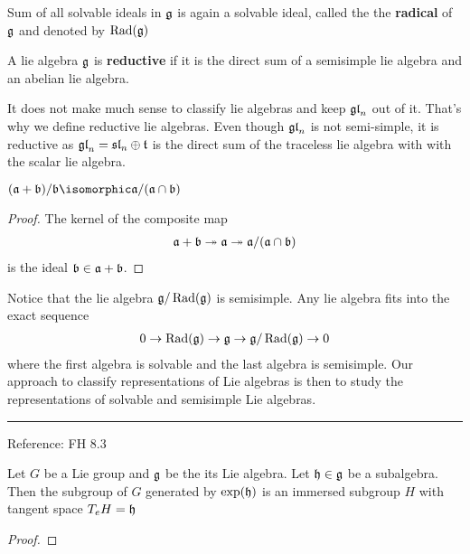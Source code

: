 \begin{definition}[Radical]
    Sum of all solvable ideals in $\mathfrak{g}$ is again a solvable ideal, called the the \textbf{radical} of $\mathfrak{g}$ and denoted by $\operatorname{Rad}(\mathfrak{g})$
\end{definition}

\begin{definition}[Reductive]
    A lie algebra $\mathfrak{g}$ is \textbf{reductive} if it is the direct sum of a semisimple lie algebra and an abelian lie algebra.
\end{definition}
\begin{insight}
   It does not make much sense to classify lie algebras and keep $\mathfrak{gl}_n$ out of it. That's why we define reductive lie algebras. Even though $\mathfrak{gl}_n$ is not semi-simple, it is reductive as $\mathfrak{gl}_n = \mathfrak{sl}_n\oplus \mathfrak{t}$ is the direct sum of the traceless lie algebra with with the scalar lie algebra.
\end{insight}

\begin{lemma}
    $ (\mathfrak{a} + \mathfrak{b})/\mathfrak{b} \isomorphic \mathfrak a / (\mathfrak a \cap \mathfrak b) $
\end{lemma}
\begin{proof} The kernel of the composite map 
   \begin{align}
       \mathfrak{a} + \mathfrak{b} \twoheadrightarrow \mathfrak{a} \twoheadrightarrow \mathfrak{a}/(\mathfrak{a} \cap \mathfrak{b})
   \end{align} 
   is the ideal $\mathfrak{b} \in \mathfrak{a} + \mathfrak{b}$.
\end{proof}


Notice that the lie algebra $\mathfrak{g}/\operatorname{Rad}(\mathfrak{g})$ is semisimple. Any lie algebra fits into the exact sequence
\begin{align}
    0\to \operatorname{Rad}(\mathfrak{g}) \to \mathfrak{g} \to \mathfrak{g}/\operatorname{Rad}(\mathfrak{g}) \to 0
\end{align}
where the first algebra is solvable and the last algebra is semisimple. Our approach to classify representations of Lie  algebras is then to study the representations of solvable and semisimple Lie algebras.

\begin{theorem}
    
\end{theorem}

\vspace{1em}
\hrule
\vspace{1em}

Reference: FH 8.3
\begin{proposition}
    Let $G$ be a Lie group and $\mathfrak{g}$ be the its Lie algebra. Let $\mathfrak{h}\in \mathfrak{g}$ be a subalgebra. 
    Then the subgroup of $G$ generated by $\exp(\mathfrak{h})$ is an immersed subgroup $H$ with tangent space $T_eH=\mathfrak{h}$
\end{proposition}
\begin{proof}
\end{proof}


